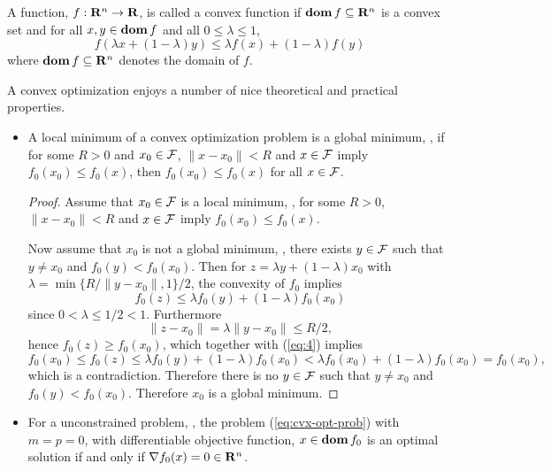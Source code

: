 A function, $f:\mathbf{R}^n \to \mathbf{R}$, is called a convex function if
$\mathop{\bf dom} f \subseteq \mathbf{R}^n$ is a convex set
and
for all $x, y\in\mathop{\bf dom} f$
and all $0\leq \lambda \leq 1$,
\begin{equation}
    f( \lambda x + (1-\lambda) y) \leq
    \lambda f(x) + (1-\lambda) f(y)
\end{equation}
where $\mathop{\bf dom} f \subseteq \mathbf{R}^n$ denotes the domain of $f$.

A convex optimization enjoys a number of nice theoretical and practical properties.

\begin{itemize}
\item A local minimum of a convex optimization problem is a global minimum,
\ie,
if for some $R>0$ and $x_0\in\mathcal{F}$, $\|x-x_0\|<R$ and $x\in\mathcal{F}$ imply $f_0(x_0) \leq f_0(x)$,
then $f_0(x_0) \leq f_0(x)$ for all $x\in\mathcal{F}$.
\begin{proof}
Assume that $x_0\in\mathcal{F}$ is a local minimum, \ie,
for some $R>0$, $\|x-x_0\|<R$ and $x\in\mathcal{F}$ imply $f_0(x_0) \leq f_0(x)$.

Now assume that $x_0$ is not a global minimum, \ie, there exists $y\in\mathcal{F}$
such that $y\neq x_0$ and $f_0(y) < f_0(x_0)$.
Then for $z = \lambda y + (1-\lambda) x_0$ with $\lambda = \min\{ R/\|y-x_0\|, 1\}/2$,
the convexity of $f_0$ implies
\begin{equation}
\label{eq:4}
f_0(z) \leq \lambda f_0(y) + (1-\lambda) f_0(x_0)
\end{equation}
since $0 < \lambda \leq 1/2 < 1$.
Furthermore
\begin{equation}
\|z - x_0\| = \lambda \|y-x_0\| \leq R/2,
\end{equation}
hence $f_0(z) \geq f_0(x_0)$, which together with (\ref{eq:4}) implies
\begin{equation}
f_0(x_0) \leq f_0(z)
\leq \lambda f_0(y) + (1-\lambda) f_0(x_0)
< \lambda f_0(x_0) + (1-\lambda) f_0(x_0)
= f_0(x_0),
\end{equation}
which is a contradiction.
Therefore there is no $y\in\mathcal{F}$ such that $y\neq x_0$ and $f_0(y) < f_0(x_0)$.
Therefore $x_0$ is a global minimum.
\end{proof}



\item For a unconstrained problem, \ie, the problem (\ref{eq:cvx-opt-prob}) with $m=p=0$, with differentiable objective function,
$x\in\mathop{\bf dom} f_0$ is an optimal solution if and only if $\nabla f_0(x)= 0 \in \mathbf{R}^n$.


\end{itemize}
